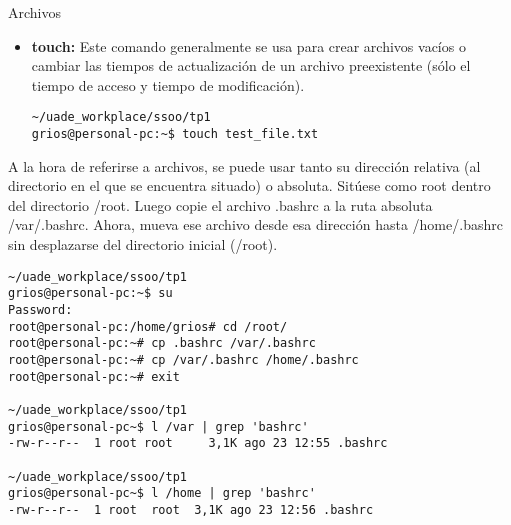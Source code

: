 \begin{section}{Archivos}
\begin{itemize}
\item \textbf{touch:}
Este comando generalmente se usa para crear archivos vacíos o cambiar las tiempos de actualización de un archivo preexistente (sólo el tiempo de acceso y tiempo de modificación).
\begin{lstlisting}[style=Ubuntu]
~/uade_workplace/ssoo/tp1
grios@personal-pc:~$ touch test_file.txt
\end{lstlisting}
\end{itemize}


\begin{quoting}
A la hora de referirse a archivos, se puede usar tanto su dirección relativa (al directorio en el que se
encuentra situado) o absoluta. Sitúese como root dentro del directorio /root. Luego copie el archivo .bashrc
a la ruta absoluta /var/.bashrc. Ahora, mueva ese archivo desde esa dirección hasta /home/.bashrc sin
desplazarse del directorio inicial (/root).
\end{quoting}

\begin{lstlisting}[style=Ubuntu]
~/uade_workplace/ssoo/tp1
grios@personal-pc:~$ su
Password: 
root@personal-pc:/home/grios# cd /root/
root@personal-pc:~# cp .bashrc /var/.bashrc
root@personal-pc:~# cp /var/.bashrc /home/.bashrc
root@personal-pc:~# exit

~/uade_workplace/ssoo/tp1
grios@personal-pc~$ l /var | grep 'bashrc' 
-rw-r--r--  1 root root     3,1K ago 23 12:55 .bashrc

~/uade_workplace/ssoo/tp1
grios@personal-pc~$ l /home | grep 'bashrc' 
-rw-r--r--  1 root  root  3,1K ago 23 12:56 .bashrc
                                                             
\end{lstlisting}

\end{section}
